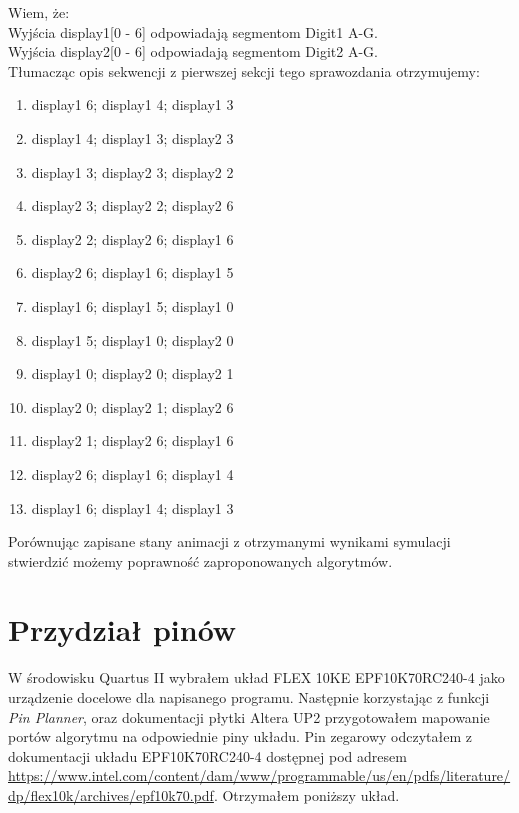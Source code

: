 \documentclass{article}
\begin{document}
        Wiem, że:\\
        Wyjścia display1[0 - 6] odpowiadają segmentom Digit1 A-G.\\
        Wyjścia display2[0 - 6] odpowiadają segmentom Digit2 A-G.\\
        Tłumacząc opis sekwencji z pierwszej sekcji tego sprawozdania otrzymujemy: 
        \begin{enumerate}
            \item display1 6; display1 4; display1 3
            \item display1 4; display1 3; display2 3  
            \item display1 3; display2 3; display2 2
            \item display2 3; display2 2; display2 6
            \item display2 2; display2 6; display1 6
            \item display2 6; display1 6; display1 5
            \item display1 6; display1 5; display1 0
            \item display1 5; display1 0; display2 0
            \item display1 0; display2 0; display2 1
            \item display2 0; display2 1; display2 6
            \item display2 1; display2 6; display1 6
            \item display2 6; display1 6; display1 4
            \item display1 6; display1 4; display1 3
        \end{enumerate}

        Porównując zapisane stany animacji z otrzymanymi wynikami symulacji stwierdzić możemy poprawność zaproponowanych algorytmów.
    
    \section{Przydział pinów}
        W środowisku Quartus II wybrałem układ FLEX 10KE EPF10K70RC240-4 jako urządzenie docelowe dla napisanego programu. Następnie korzystając z funkcji \textit{Pin Planner}, oraz dokumentacji płytki Altera UP2 przygotowałem mapowanie portów algorytmu na odpowiednie piny układu. Pin zegarowy odczytałem z dokumentacji układu EPF10K70RC240-4 dostępnej pod adresem \url{https://www.intel.com/content/dam/www/programmable/us/en/pdfs/literature/dp/flex10k/archives/epf10k70.pdf}. Otrzymałem poniższy układ. 
        
\end{document}
